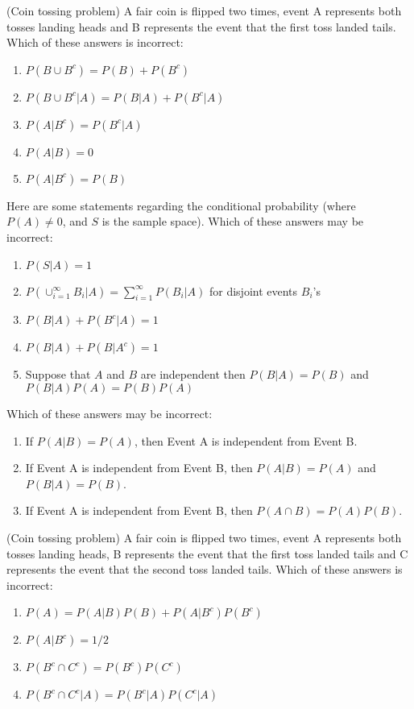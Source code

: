 \documentclass[poll_tutorial_format]{subfiles}
\begin{document}
\begin{exercise}
	(Coin tossing problem) A fair coin is flipped two times, event A represents both tosses landing heads and B represents the event that the first toss landed tails. 
	Which of these answers is incorrect: 
	\begin{enumerate}
		\item $P(B\cup B^c )=P(B)+P(B^c)$
		\item $P(B\cup B^c |A)=P(B|A)+P(B^c|A)$
		\item $P(A|B^c)=P(B^c|A)$
		\item $P(A|B)=0$
		\item $P(A|B^c)=P(B)$
	\end{enumerate}
\end{exercise}


\begin{exercise}
	Here are some statements regarding the conditional probability (where $P(A)\neq 0$, and $S$ is the sample space).
	Which of these answers may be incorrect: 
	\begin{enumerate}
		\item $P(S|A)=1$
		\item $P(\cup_{i=1}^\infty B_i|A) = \sum_{i=1}^\infty P(B_i|A)$ for disjoint events $B_i$'s
		\item $P(B|A)+P(B^c|A)=1$
		\item $P(B|A)+P(B|A^c)=1$ 
		\item Suppose that $A$ and $B$ are independent then $P(B|A)=P(B)$ and $P(B|A)P(A)=P(B)P(A)$ 
	\end{enumerate}
\end{exercise}


\begin{exercise}
	Which of these answers may be incorrect: 
	\begin{enumerate}
		\item If $P(A|B)=P(A)$, then Event A is independent from Event B.
		\item If Event A is independent from Event B, then $P(A|B)=P(A)$ and $P(B|A)=P(B)$.
		\item If Event A is independent from Event B, then $P(A\cap B)=P(A)P(B)$.
	\end{enumerate}
\end{exercise}


\begin{exercise}
	(Coin tossing problem) A fair coin is flipped two times, event A represents both tosses landing heads, B represents the event that the first toss landed tails and C represents the event that the second toss landed tails. 
Which of these answers is incorrect: 
\begin{enumerate}
		\item $P(A)=P(A|B)P(B)+P(A|B^c)P(B^c)$ 
		\item $P(A|B^c)=1/2$
		\item $P(B^c\cap C^c)=P(B^c)P(C^c)$ 
		\item $P(B^c\cap C^c|A)=P(B^c|A)P(C^c|A) $  
	\end{enumerate}
\end{exercise}
\end{document}
